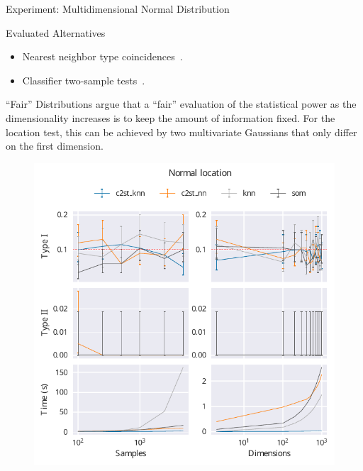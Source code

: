 \documentclass[10pt]{beamer}
\begin{document}
\begin{frame}{Experiment: Multidimensional Normal Distribution}
    \begin{block}{Evaluated Alternatives}
        \smallskip
        \begin{itemize}
            \item Nearest neighbor type coincidences~\cite{Henze1988, Schilling1986b}.
            \item Classifier two-sample tests~\cite{lopez2016revisiting}.
        \end{itemize}
    \end{block}
    \begin{block}{``Fair'' Distributions}
        \smallskip
        \cite{ramdas2015decreasing} argue that a ``fair'' evaluation of the
        statistical power as the dimensionality increases is to keep the
        amount of information fixed.
        For the location test, this can be achieved by two multivariate Gaussians that only differ
        on the first dimension.
    \end{block}
\end{frame}

\begin{frame}{}
\begin{figure}
    \centering
    \includegraphics[height=\textheight]{normal_location}
\end{figure}
\end{frame}
\end{document}
